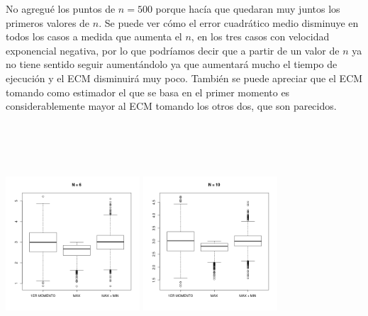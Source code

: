 \documentclass[a4paper]{article}
\begin{document}
No agregué los puntos de $n=500$ porque hacía que quedaran muy juntos los primeros valores de $n$. Se puede ver cómo el error cuadrático medio disminuye en todos los casos a medida que aumenta el $n$, en los tres casos con velocidad exponencial negativa, por lo que podríamos decir que a partir de un valor de $n$ ya no tiene sentido seguir aumentándolo ya que aumentará mucho el tiempo de ejecución y el ECM disminuirá muy poco. También se puede apreciar que el ECM tomando como estimador el que se basa en el primer momento es considerablemente mayor al ECM tomando los otros dos, que son parecidos.


\includegraphics[width=5cm,height=9cm,keepaspectratio]{boxplot_6.png}
\includegraphics[width=5cm,height=9cm,keepaspectratio]{boxplot_10.png}
\end{document}
